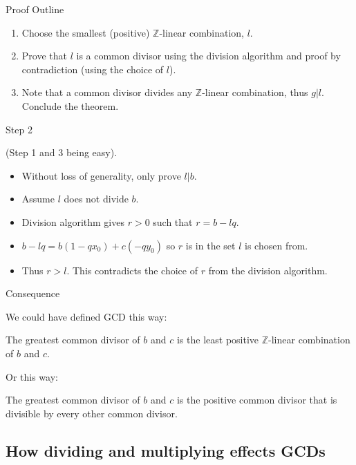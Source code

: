 \documentclass{beamer}
\begin{document}
\begin{frame}{Proof Outline}
  
  \begin{enumerate}
  \item Choose the smallest (positive) $\mathbb{Z}$-linear
    combination, $l$.
  \item Prove that $l$ is a common divisor using the division
    algorithm and proof by contradiction (using the choice of $l$).
  \item Note that a common divisor divides any $\mathbb{Z}$-linear
    combination, thus $g | l$.  Conclude the theorem.
  \end{enumerate}

\end{frame}

\begin{frame}{Step 2}

  (Step 1 and 3 being easy).
  
  \begin{itemize}
  \item Without loss of generality, only prove $l | b$.
  \item Assume $l$ does not divide $b$.
  \item Division algorithm gives $r > 0$ such that $r = b - lq$.
  \item $b - lq = b(1 - qx_0) + c(-qy_0)$ so $r$ is in the set $l$ is
    chosen from.
  \item Thus $r > l$. This contradicts the choice of $r$ from the
    division algorithm.
  \end{itemize}
\end{frame}

\begin{frame}{Consequence}

  We could have defined GCD this way:
  \begin{theorem} The greatest common divisor of $b$ and $c$ is the
    least positive $\mathbb{Z}$-linear combination of $b$ and $c$.
  \end{theorem}
  
  Or this way:
  \begin{theorem} The greatest common divisor of $b$ and $c$ is the
    positive common divisor  that is divisible by every other common
    divisor.
  \end{theorem}

\end{frame}

\subsection{How dividing and multiplying effects GCDs}
\end{document}
